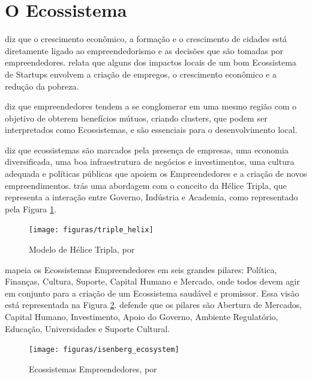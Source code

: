 \section{O Ecossistema}
\label{section:ecossistemas_e_suas_pecas}

 diz que o crescimento econômico, a formação e o crescimento de cidades está diretamente ligado ao empreendedorismo e as decisões que são tomadas por empreendedores.  relata que alguns dos impactos locais de um bom Ecossistema de Startups envolvem a criação de empregos, o crescimento econômico e a redução da pobreza. 

 diz que empreendedores tendem a se conglomerar em uma mesmo região com o objetivo de obterem benefícios mútuos, criando clusters, que podem ser interpretados como Ecossistemas, e são essenciais para o desenvolvimento local.

 diz que ecossistemas são marcados pela presença de empresas, uma economia diversificada, uma boa infraestrutura de negócios e investimentos, uma cultura adequada e políticas públicas que apoiem os Empreendedores e a criação de novos empreendimentos.  trás uma abordagem com o conceito da Hélice Tripla, que representa a interação entre Governo, Indústria e Academia, como representado pela Figura \ref{figure:triple_helix}. 

\begin{figure}[!htb]
\centering
\texttt{[image: figuras/triple\_helix]}
\caption{Modelo de Hélice Tripla, por }
\label{figure:triple_helix}
\end{figure}

 mapeia os Ecossistemas Empreendedores em seis grandes pilares: Política, Finanças, Cultura, Suporte, Capital Humano e Mercado, onde todos devem agir em conjunto para a criação de um Ecossistema saudável e promissor. Essa visão está representada na Figura \ref{figure:isenberg_ecosystem}.  defende que os pilares são Abertura de Mercados, Capital Humano, Investimento, Apoio do Governo, Ambiente Regulatório, Educação, Universidades e Suporte Cultural.

\begin{figure}[!htb]
\centering
\texttt{[image: figuras/isenberg\_ecosystem]}
\caption{Ecossistemas Empreendedores, por }
\label{figure:isenberg_ecosystem}
\end{figure}

